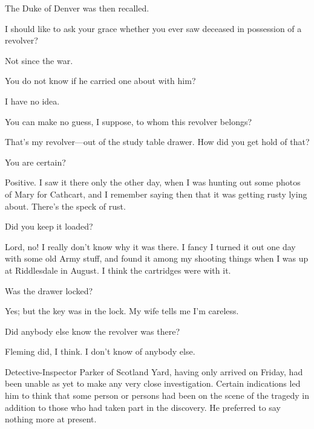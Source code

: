 The Duke of Denver was then recalled.
\begin{dialogue}

 I should like to ask your grace whether you ever saw deceased in possession of a revolver?

 Not since the war.

 You do not know if he carried one about with him?

 I have no idea.

 You can make no guess, I suppose, to whom this revolver belongs?

  That's my revolver\allowbreak---\allowbreak out of the study table drawer. How did you get hold of that? 

 You are certain?

 Positive. I saw it there only the other day, when I was hunting out some photos of Mary for Cathcart, and I remember saying then that it was getting rusty lying about. There's the speck of rust.

 Did you keep it loaded?

 Lord, no! I really don't know why it was there. I fancy I turned it out one day with some old Army stuff, and found it among my shooting things when I was up at Riddlesdale in August. I think the cartridges were with it.

 Was the drawer locked?

 Yes; but the key was in the lock. My wife tells me I'm careless.

 Did anybody else know the revolver was there?

 Fleming did, I think. I don't know of anybody else.
\end{dialogue}

Detective-Inspector Parker of Scotland Yard, having only arrived on Friday, had been unable as yet to make any very close investigation.  Certain indications led him to think that some person or persons had been on the scene of the tragedy in addition to those who had taken part in the discovery. He preferred to say nothing more at present.

